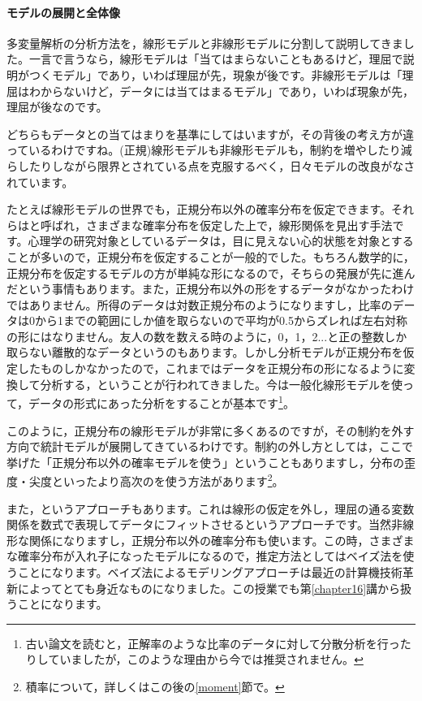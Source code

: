 \documentclass{ltjsbook}
\begin{document}
\paragraph{モデルの展開と全体像}

多変量解析の分析方法を，線形モデルと非線形モデルに分割して説明してきました。一言で言うなら，線形モデルは「当てはまらないこともあるけど，理屈で説明がつくモデル」であり，いわば理屈が先，現象が後です。非線形モデルは「理屈はわからないけど，データには当てはまるモデル」であり，いわば現象が先，理屈が後なのです。

どちらもデータとの当てはまりを基準にしてはいますが，その背後の考え方が違っているわけですね。(正規)線形モデルも非線形モデルも，制約を増やしたり減らしたりしながら限界とされている点を克服するべく，日々モデルの改良がなされています。

たとえば線形モデルの世界でも，正規分布以外の確率分布を仮定できます。それらはと呼ばれ，さまざまな確率分布を仮定した上で，線形関係を見出す手法です。心理学の研究対象としているデータは，目に見えない心的状態を対象とすることが多いので，正規分布を仮定することが一般的でした。もちろん数学的に，正規分布を仮定するモデルの方が単純な形になるので，そちらの発展が先に進んだという事情もあります。また，正規分布以外の形をするデータがなかったわけではありません。所得のデータは対数正規分布のようになりますし，比率のデータは0から1までの範囲にしか値を取らないので平均が0.5からズレれば左右対称の形にはなりません。友人の数を数える時のように，0，1，2...と正の整数しか取らない離散的なデータというのもあります。しかし分析モデルが正規分布を仮定したものしかなかったので，これまではデータを正規分布の形になるように変換して分析する，ということが行われてきました。今は一般化線形モデルを使って，データの形式にあった分析をすることが基本です\footnote{古い論文を読むと，正解率のような比率のデータに対して分散分析を行ったりしていましたが，このような理由から今では推奨されません。}。

このように，正規分布の線形モデルが非常に多くあるのですが，その制約を外す方向で統計モデルが展開してきているわけです。制約の外し方としては，ここで挙げた「正規分布以外の確率モデルを使う」ということもありますし，分布の歪度・尖度といったより高次のを使う方法があります\footnote{積率について，詳しくはこの後の\ref{moment}節で。}。

また，というアプローチもあります。これは線形の仮定を外し，理屈の通る変数関係を数式で表現してデータにフィットさせるというアプローチです。当然非線形な関係になりますし，正規分布以外の確率分布も使います。この時，さまざまな確率分布が入れ子になったモデルになるので，推定方法としてはベイズ法を使うことになります。ベイズ法によるモデリングアプローチは最近の計算機技術革新によってとても身近なものになりました。この授業でも第\ref{chapter16}講から扱うことになります。
\end{document}
